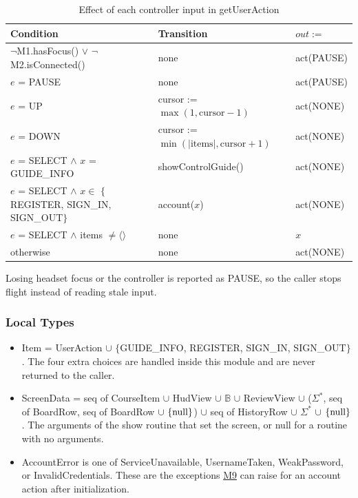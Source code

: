 \documentclass[12pt, titlepage]{article}
\newcommand{\nul}{\textnormal{null}}
\newcommand{\Mref}[1]{\hyperref[sec:M#1]{M#1}}
\begin{document}
\begin{table}[h!]
\centering
\renewcommand{\arraystretch}{1.15}
\begin{tabularx}{\textwidth}{>{\raggedright\arraybackslash}p{4.6cm}
>{\raggedright\arraybackslash}X >{\raggedright\arraybackslash}p{2.6cm}}
\toprule
\textbf{Condition} & \textbf{Transition} & \textbf{$out :=$} \\
\midrule
$\neg$M1.hasFocus() $\vee$ $\neg$M2.isConnected() & none & act(PAUSE) \\
$e$ = PAUSE & none & act(PAUSE) \\
$e$ = UP & cursor := $\max(1, \text{cursor} - 1)$ & act(NONE) \\
$e$ = DOWN & cursor := $\min(|\text{items}|, \text{cursor} + 1)$ & act(NONE) \\
$e$ = SELECT $\wedge$ $x$ = GUIDE\_INFO & showControlGuide() & act(NONE) \\
$e$ = SELECT $\wedge$ $x \in$ $\{$REGISTER, SIGN\_IN, SIGN\_OUT$\}$ &
account($x$) & act(NONE) \\
$e$ = SELECT $\wedge$ items $\neq \langle\rangle$ & none & $x$ \\
otherwise & none & act(NONE) \\
\bottomrule
\end{tabularx}
\caption{Effect of each controller input in getUserAction}
\label{TblM3Action}
\end{table}

Losing headset focus or the controller is reported as PAUSE, so the caller
stops flight instead of reading stale input.

\subsubsection{Local Types}

\begin{itemize}
\item Item = UserAction $\cup$ $\{$GUIDE\_INFO, REGISTER, SIGN\_IN,
  SIGN\_OUT$\}$. The four extra choices are handled inside this module and are
  never returned to the caller.
\item ScreenData = seq of CourseItem $\cup$ HudView $\cup$ $\mathbb{B}$ $\cup$
  ReviewView $\cup$ ($\Sigma^*$, seq of BoardRow, seq of BoardRow $\cup
  \ \{\nul\}$) $\cup$ seq of HistoryRow $\cup$ $\Sigma^*$ $\cup$ $\{\nul\}$.
  The arguments of the show routine that set the screen, or \nul{} for a
  routine with no arguments.
\item AccountError is one of ServiceUnavailable, UsernameTaken,
  WeakPassword, or InvalidCredentials. These are the exceptions
  \Mref{9} can raise for an account action after initialization.
\end{itemize}
\end{document}
